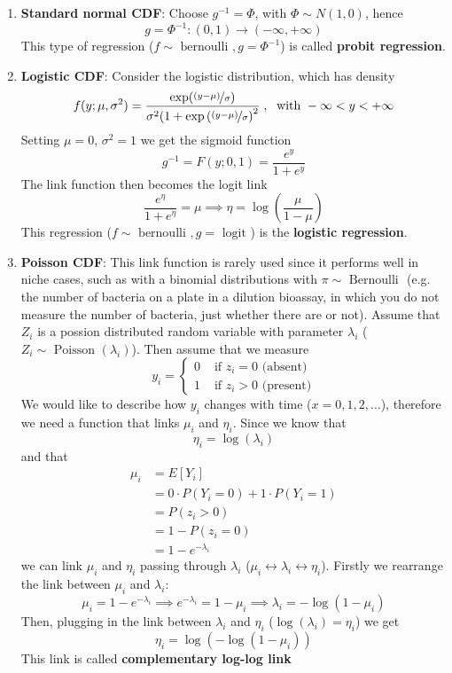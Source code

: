       \begin{enumerate}
        \item \textbf{Standard normal CDF}: Choose $g^{-1}=\Phi$, with $\Phi \sim N(1,0)$, hence
          $$g = \Phi^{-1} : (0,1) \to (-\infty, +\infty)$$
          This type of regression ($f \sim \text{ bernoulli }, g = \Phi^{-1}$) is called \textbf{probit regression}.
        \item \textbf{Logistic CDF}: Consider the logistic distribution, which has density
          $$f(y; \mu, \sigma^2) = \frac{\exp(\nicefrac{(y-\mu)}{\sigma})}{\sigma^2(1 + \exp\left(\nicefrac{(y-\mu)}{\sigma}\right)^2}\;,\; \text{ with } -\infty < y < +\infty$$
          Setting $\mu = 0$, $\sigma^2 = 1$ we get the sigmoid function
          $$g^{-1} = F(y; 0, 1) = \frac{e^y}{1 + e^y}$$
          The link function then becomes the logit link
          $$\frac{e^\eta}{1 + e^\eta} = \mu \implies \eta = \log\left(\frac{\mu}{1-\mu}\right)$$
          This regression ($f \sim \text{ bernoulli }, g = \text{ logit }$) is the \textbf{logistic regression}. 
        \item \textbf{Poisson CDF}: This link function is rarely used since it performs well in niche cases, such as with a binomial distributions with $\pi \sim \text{ Bernoulli }$ (e.g. the number of bacteria on a plate in a dilution bioassay, in which you do not measure the number of bacteria, just whether there are or not). Assume that $Z_i$ is a possion distributed random variable with parameter $\lambda_i$ ($Z_i \sim \text{ Poisson }(\lambda_i)$). Then assume that we measure
        $$
        y_i = 
        \begin{cases}
          0 & \text{ if } z_i = 0 \text{ (absent)} \\
          1 & \text{ if }  z_i > 0 \text{ (present)}
        \end{cases}
        $$
        We would like to describe how $y_i$ changes with time ($x = 0, 1, 2, \dots$), therefore we need a function that links $\mu_i$ and $\eta_i$.
        Since we know that 
        $$\eta_i = \log(\lambda_i)$$
        and that
        \begin{align*}
        \mu_i 
          &= E[Y_i] \\
          &= 0 \cdot P(Y_i = 0) + 1 \cdot P(Y_i = 1) \\
          &= P(z_i > 0) \\ 
          &= 1 - P(z_i = 0) \\
          &= 1 - e^{-\lambda_i}
        \end{align*}
        we can link $\mu_i$ and $\eta_i$ passing through $\lambda_i$ ($\mu_i \leftrightarrow \lambda_i \leftrightarrow \eta_i$). Firstly we rearrange the link between $\mu_i$ and $\lambda_i$:
        $$\mu_i = 1 - e^{-\lambda_i} \implies e^{-\lambda_i} = 1 - \mu_i \implies \lambda_i = -\log(1 - \mu_i)$$
        Then, plugging in the link between $\lambda_i$ and $\eta_i$ ($\log(\lambda_i) = \eta_i$) we get
        $$\eta_i = \log(-\log(1-\mu_i))$$
        This link is called \textbf{complementary log-log link}
      \end{enumerate}

